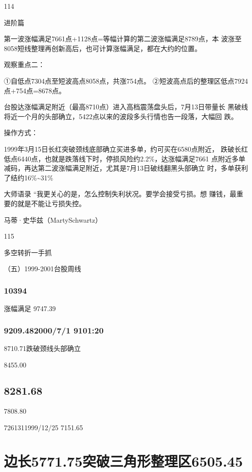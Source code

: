 \documentclass{article}
\begin{document}
114

\clearpage

进阶篇

第一波涨幅满足7661点+1128点=等幅计算的第二波涨幅满足8789点，本 波涨至8058短线整理再创新高后，也可计算涨幅满足，都在大约的位置。

观察重点二：

①自低点7304点至短波高点8058点，共涨754点。 ②短波高点后的整理区低点7924点+754点=8678点。

台股达涨幅满足附近（最高8710点）进入高档震荡盘头后，7月13日带量长 黑破线将近一个月的头部确立，5422点以来的波段多头行情也告一段落，大幅回 跌。

操作方式：

1999年3月15日长红突破颈线底部确立买进多单，约可买在6580点附近， 跌破长红低点6440点，也就是跌落线下时，停损风险约2.2\%，达涨幅满足7661 点附近多单减码，再达第二波涨幅满足附近，尤其是7月13日破线翻黑头部确立 时，多单获利了结约16\%\textasciitilde{}31\%

大师语录 “我更关心的是，怎么控制失利状况。要学会接受亏损。想 赚钱，最重要的就是不能让亏损失控。

马蒂·史华兹（MartySchwartz）

115

\clearpage

多空转折一手抓

（五）1999-2001台股周线

\subsubsection{10394}

涨幅满足 9747.39

\subsubsection{9209.482000/7/1 9101:20}

8710.71跌破颈线头部确立

8455.00

\subsection{8281.68}

7808.80

7261311999/12/25 7151.65

\section{边长5771.75突破三角形整理区6505.45}
\end{document}
